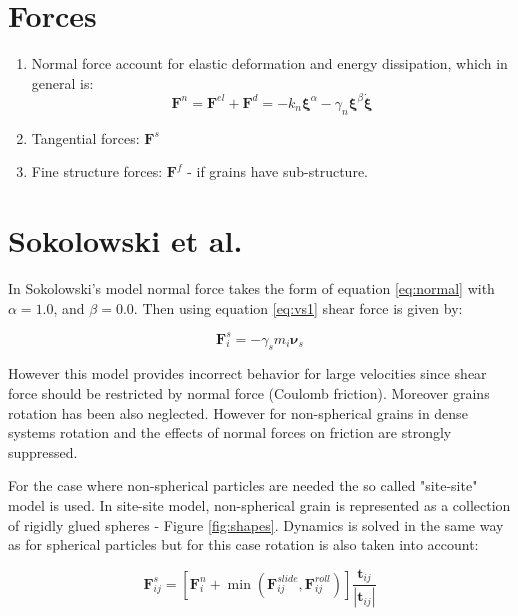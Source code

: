 \documentclass[10pt,a4paper]{article}
\begin{document}
\section{Forces}
\begin{enumerate}
 \item Normal force account for elastic deformation and energy dissipation, which in general is:
 \begin{equation}\label{eq:normal}
  \mathbf{F}^{n} = \mathbf{F}^{el} + \mathbf{F}^{d} = -k_n\mathbf{\xi}^{\alpha} - \gamma_n \mathbf{\xi}^{\beta}\dot{\mathbf{\xi}}
 \end{equation}


 \item Tangential forces: $\mathbf{F}^{s}$
 \item Fine structure forces: $\mathbf{F}^{f}$ - if grains have sub-structure.

\end{enumerate}


\section{Sokolowski et al. \cite{sok92, sok93}}
In Sokolowski's model normal force takes the form of equation \ref{eq:normal} with $\alpha=1.0$, and $\beta=0.0$.
Then using equation \ref{eq:vs1} shear force is given by:

\begin{equation}
  \mathbf{F}^{s}_i = -\gamma_s m_i \mathbf{\nu}_s
\end{equation}

However this model provides incorrect behavior for large velocities since shear force should be restricted 
by normal force (Coulomb friction). Moreover grains rotation has been also neglected. 
However for non-spherical grains in dense systems rotation and the effects of normal forces on friction are strongly suppressed. 

For the case where non-spherical particles are needed the so called "site-site" model is used. In site-site model, non-spherical
grain is represented as a collection of rigidly glued spheres - Figure \ref{fig:shapes}.
Dynamics is solved in the same way as for spherical particles but for this case rotation is also taken into account:

\begin{equation}
 \mathbf{F}^{s}_{ij} = \left[\mathbf{F}^{n}_i + \min(\mathbf{F}^{slide}_{ij}, \mathbf{F}^{roll}_{ij})\right]  \frac{ \mathbf{t}_{ij} } { |\mathbf{t}_{ij}| }
\end{equation}
\end{document}
